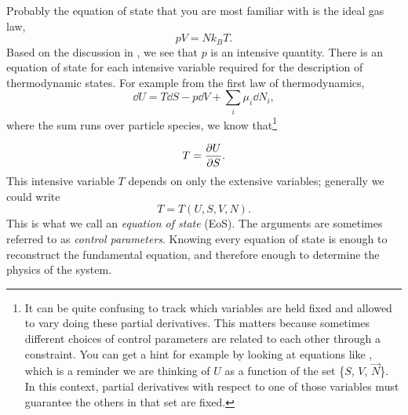Probably the equation of state that you are most familiar with is the 
ideal gas law,
\begin{equation}
  pV=Nk_BT.
\end{equation}
Based on the discussion in , we see that $p$ is
an intensive quantity.
There is an equation of state for each intensive variable required for the
description of thermodynamic states. For example from the
first law of thermodynamics,
\begin{equation}\label{eq:fslaw}
  \dd{U}=T\dd{S}-p\dd{V}+\sum_i\mu_i\dd{N}_i,
\end{equation}
where the sum runs over particle species,
we know that\footnote{It can be quite confusing to track which variables
are held fixed and allowed to vary doing these partial derivatives.
This matters because sometimes different choices of control parameters
are related to each other through a constraint.
You can get a hint for example by looking at equations like
, which is a reminder we are thinking of
$U$ as a function of the set \{$S$, $V$, $\vec{N}$\}. In this context,
partial derivatives with respect to one of those variables must
guarantee the others in that set are fixed.}

\begin{equation}
  T=\pdv{U}{S}.
\end{equation}
This intensive variable $T$ depends on only the extensive variables; 
generally we could write
\begin{equation}
  T=T(U,S,V,N).
\end{equation}
This is what we call an {\it equation of state}
(EoS). The arguments are sometimes referred to as 
{\it control parameters}. Knowing every equation 
of state is enough to reconstruct the fundamental equation, and therefore 
enough to determine the physics of the system.

